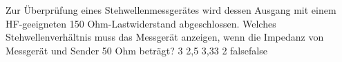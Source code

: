     {Zur Überprüfung eines Stehwellenmessgerätes wird dessen Ausgang mit einem HF-geeigneten 150 Ohm-Lastwiderstand abgeschlossen. Welches Stehwellenverhältnis muss das Messgerät anzeigen, wenn die Impedanz von Messgerät und Sender 50 Ohm beträgt?}
    {3}
    {2,5}
    {3,33}
    {2}
    {false}{false}